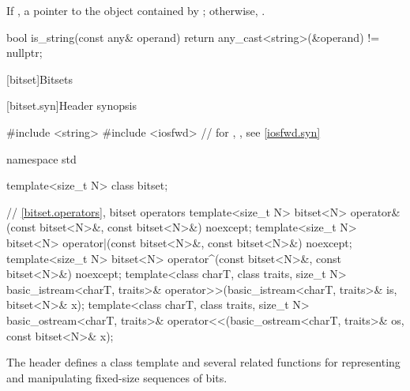 \begin{itemdescr}
\pnum
\returns
If ,
a pointer to the object contained by ;
otherwise, .

\pnum
\begin{example}
\begin{codeblock}
bool is_string(const any& operand) {
  return any_cast<string>(&operand) != nullptr;
}
\end{codeblock}
\end{example}
\end{itemdescr}

[bitset]{Bitsets}
%

[bitset.syn]{Header  synopsis}%

%

\begin{codeblock}
#include <string>
#include <iosfwd>   // for , , see \ref{iosfwd.syn}

namespace std {
  template<size_t N> class bitset;

  // \ref{bitset.operators}, bitset operators
  template<size_t N>
    bitset<N> operator&(const bitset<N>&, const bitset<N>&) noexcept;
  template<size_t N>
    bitset<N> operator|(const bitset<N>&, const bitset<N>&) noexcept;
  template<size_t N>
    bitset<N> operator^(const bitset<N>&, const bitset<N>&) noexcept;
  template<class charT, class traits, size_t N>
    basic_istream<charT, traits>&
      operator>>(basic_istream<charT, traits>& is, bitset<N>& x);
  template<class charT, class traits, size_t N>
    basic_ostream<charT, traits>&
      operator<<(basic_ostream<charT, traits>& os, const bitset<N>& x);
}
\end{codeblock}

\pnum
The header
defines a
class template
and several related functions for representing
and manipulating fixed-size sequences of bits.

